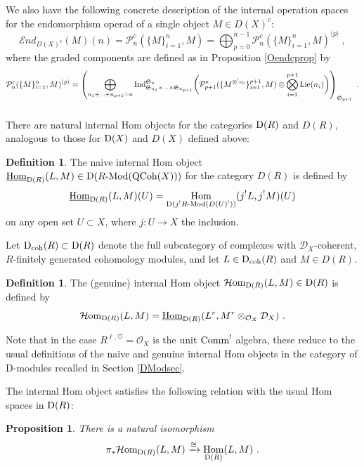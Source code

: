 \documentclass[11pt]{amsart}
\numberwithin{equation}{section}
\newtheorem{prop}[theo]{Proposition}
\theoremstyle{definition}
\newtheorem{defn}[theo]{Definition}
\newcommand{\mc}{\mathcal}
\newcommand{\mf}{\mathfrak}
\newcommand{\iEnd}{{\mathcal{E}nd}}
\DeclareMathOperator{\Hom}{Hom}
\newcommand{\Mod}{{\textup{-Mod}}}
\newcommand{\Ind}{{\textup{Ind}}}
\newcommand{\Comm}{{\textup{Comm}}}
\newcommand{\Lie}{{\textup{Lie}}}
\newcommand{\Homi}{{\mc H\textup{om}}}
\newcommand{\coh}{{\textup{coh}}}
\newcommand{\Ss}{{{\mf{S}}}}
\newcommand{\0}{{\textbf{0}}}
\DeclareMathOperator{\QC}{QCoh}
\newcommand{\Dd}{{\textup{D}}}
\newcommand{\DD}{{D}}
\newcommand{\Homii}{{\underline{\textup{Hom}}}}
\def\PP{{\mc P}}
\def \mf{\mathfrak}
\begin{document}
We also have the following concrete description of the internal operation spaces for the endomorphism operad of a single object $M\in \DD(X)^c$:
\[ 
\iEnd_{\DD(X)^c}(M)(n)= \mc P_n^c(\{ M\}_{i=1}^n,M) =\bigoplus_{p=0}^{n-1}\PP_n^c(\{M\}_{i=1}^n,M)^{\langle p \rangle}~,
\]
where the graded components are defined as in Proposition \ref{Oendcprop} by
\begin{equation}\label{Pclinteqn}
	\PP_n^c(\{M\}_{i=1}^n,M)^{\langle p \rangle}=   \left( \bigoplus_{n_1+...+n_{p+1}=n} \Ind_{\Ss_{n_1}\times ... \times \Ss_{n_{p+1}}}^{\Ss_n}\bigg(\mc P^*_{p+1}(\{M^{\otimes^! n_i}\}_{i=1}^{p+1}, M)\otimes \bigotimes_{i=1}^{p+1}\Lie(n_i)\bigg)\right)_{\Ss_{p+1}}   \ .
\end{equation}



\subsubsection{} There are natural internal Hom objects for the categories $\Dd(R)$ and $\DD(R)$, analogous to those for $\Dd(X)$ and $\DD(X)$ defined above:

\begin{defn}
	The naive internal Hom object $ \Homii_{\Dd(R)}(L,M) \in \Dd(R\Mod(\QC(X)))$ for the category $\DD(R)$ is defined by
	\[  \Homii_{\Dd(R)}(L,M)(U) = \Hom_{\Dd(j^!R\Mod(\DD(U)^!))}(j^!L,j^!M)(U) \]
	on any open set $U\subset X$, where $j:U\to X$ the inclusion.
\end{defn}

Let $\Dd_\coh(R) \subset \Dd(R)$ denote the full subcategory of complexes with $\mc D_X$-coherent, $R$-finitely generated cohomology modules, and let $L\in \Dd_\coh(R)$ and $M\in \DD(R)$.

\begin{defn}  The (genuine) internal Hom object $\Homi_{\Dd(R)}(L,M) \in \Dd(R)$ is defined by 
	\[\Homi_{\Dd(R)}(L,M)  = \Homii_{\Dd(R)}(L^r, M^r \otimes_{\mc O_X} \mc D_X ) \ . \]
\end{defn}
Note that in the case $R^{\ell,\heartsuit}=\mc O_X$ is the unit $\Comm^!$ algebra, these reduce to the usual definitions of the naive and genuine internal Hom objects in the category of D-modules recalled in Section \ref{DModsec}.


The internal Hom object satisfies the following relation with the usual Hom spaces in $\Dd(R)$:
\begin{prop}\label{Rinthommatchprop} There is a natural isomorphism
	\[ \pi_* \Homi_{\Dd(R)}(L,M) \xrightarrow{\cong} \Hom_{\Dd(R)}(L,M) \  .  \]
\end{prop}
\end{document}
